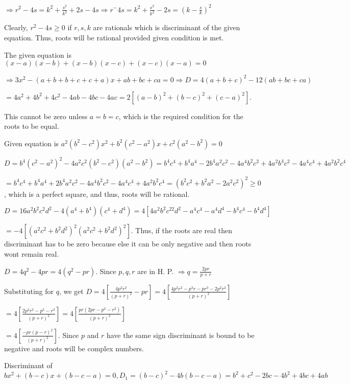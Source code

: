   $\Rightarrow r^2 - 4s = k^2 + \frac{s^2}{k^2} + 2s - 4s\Rightarrow r^ - 4s = k^2 + \frac{s^2}{k^2} - 2s
  = \left(k - \frac{s}{k}\right)^2$

  Clearly, $r^2 - 4s \geq 0$ if $r, s, k$ are rationals which is discriminant of the given equation. Thus, roots will
  be rational provided given condition is met.
\item The given equation is $(x - a)(x - b) + (x - b)(x - c) + (x - c)(x - a) = 0$

  $\Rightarrow 3x^2 -(a + b + b + c + c + a)x + ab + bc + ca = 0\Rightarrow D = 4(a + b + c)^2 - 12(ab + bc + ca)$

  $= 4a^2 + 4b^2 + 4c^2 - 4ab - 4bc - 4ac = 2[(a - b)^2 + (b - c)^2 + (c - a)^2]$.

  This cannot be zero unless $a = b = c$, which is the required condition for the roots to be equal.
\item Given equation is $a^2(b^2 - c^2)x^2 + b^2(c^2 - a^2)x + c^2(a^2 - b^2) = 0$

  $D = b^4(c^2 - a^2)^2 - 4a^2c^2(b^2 - c^2)(a^2 - b^2) = b^4c^4 + b^4a^4 - 2b^4a^2c^2 - 4a^4b^2c^2 +
  4a^2b^4c^2 - 4a^4c^4 + 4a^2b^2c^4$

  $= b^4c^4 + b^4a^4 + 2b^4a^2c^2 - 4a^4b^2c^2 - 4a^4c^4 + 4a^2b^2c^4 = (b^2c^2 + b^2a^2 - 2a^2c^2)^2 \geq
  0$, which is a perfect square, and thus, roots will be rational.
\item $D = 16a^2b^2c^2d^2 - 4(a^4 + b^4)(c^4 + d^4) = 4[4a^2b^2c^22d^2 - a^4c^4 - a^4d^4 - b^4c^4 - b^4d^4]$

  $= -4[(a^2c^2 + b^2d^2)^2(a^2c^2 + b^2d^2)^2]$. Thus, if the roots are real then discriminant has to be
  zero because else it can be only negative and then roots wont remain real.
\item $D = 4q^2 - 4pr = 4(q^2 - pr)$. Since $p, q, r$ are in H. P. $\Rightarrow q = \frac{2pr}{p + r}$

  Substituting for $q$, we get $D = 4\left[\frac{4p^2r^2}{(p + r)^2} - pr\right] = 4\left[\frac{4p^2r^2 -
      p^3r - pr^3 - 2p^2r^2}{(p + r)^2}\right]$

  $= 4\left[\frac{2p^2r^2 - p^3 - r^3}{(p + r)^2}\right] = 4\left[\frac{pr(2pr - p^2 - r^2)}{(p + r)^2}\right]$

  $= 4\left[\frac{-pr(p - r)^2}{(p + r)^2}\right]$. Since $p$ and $r$ have the same sign discriminant is
  bound to be negative and roots will be complex numbers.
\item Discriminant of $bx^2 + (b - c)x + (b - c - a) = 0, D_1 = (b - c)^2 -4b(b - c - a) = b^2 + c^2 -2bc -4b^2 + 4bc + 4ab$

